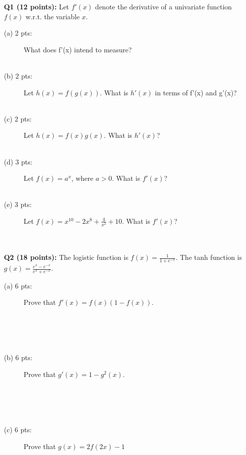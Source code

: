 \documentclass[11pt]{article}
\begin{document}
\vspace{0.4 in}
\noindent
       {\bf Q1 (12 points):} Let $f'(x)$ denote the derivative of a
         univariate function $f(x)$ w.r.t. the variable $x$.
\begin{description}
   \item [(a) 2 pts:] What does f'(x) intend to measure? \\ \\
  
   \item [(b) 2 pts:] Let $h(x)=f(g(x))$. What is $h'(x)$ in terms of
       f'(x) and g'(x)? \\ \\

   \item [(c) 2 pts:] Let $h(x)=f(x)g(x)$. What is $h'(x)$? \\ \\

   \item [(d) 3 pts:] Let $f(x)=a^x$, where $a>0$. What is $f'(x)$? \\ \\

   \item [(e) 3 pts:] Let $f(x)= x^{10}-2x^8 + \frac{4}{x^2} + 10$.
            What is $f'(x)$? \\ \\ \\
\end{description}


\vspace{0.4 in}
\noindent
{\bf Q2 (18 points):} The logistic function is $f(x)=\frac{1}{1+e^{-x}}$.
       The tanh function is $g(x)=\frac{e^x - e^{-x}}{e^x +e^{-x}}$.
    \begin{description}
     \item [(a) 6 pts:] Prove that $f'(x)=f(x)(1-f(x))$. \\ \\ \\ \\ \\
     \item [(b) 6 pts:] Prove that $g'(x)=1 - g^2(x)$. \\  \\ \\ \\   \\
     \item [(c) 6 pts:] Prove that $g(x) = 2f(2x)-1$  \\  \\ \\ \\ \\ \\ \\ \\
    \end{description}
    
\end{document}
